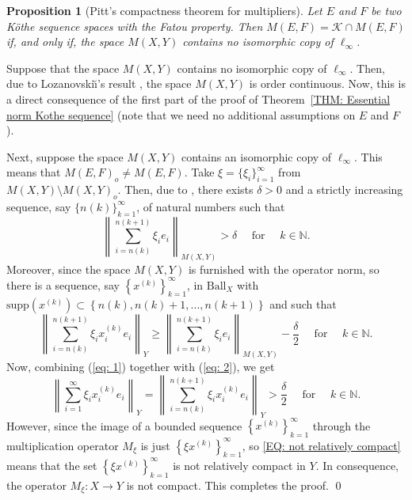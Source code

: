 \documentclass[11pt]{amsart}
\theoremstyle{definition}
\theoremstyle{definition}
\theoremstyle{definition}
\theoremstyle{definition}
\newtheorem{proposition}[theorem]{Proposition}
\theoremstyle{definition}
\theoremstyle{definition}
\theoremstyle{definition}
\theoremstyle{definition}
\numberwithin{equation}{section}
\numberwithin{equation}{section}
\numberwithin{equation}{section}
\theoremstyle{definition}
\theoremstyle{definition}
\theoremstyle{definition}
\theoremstyle{definition}
\theoremstyle{definition}
\theoremstyle{definition}
\newcommand{\norm}[1]{\left\lVert#1\right\rVert}
\renewenvironment{proof}{\noindent {\bf Proof.}}{\qed}
\begin{document}
	\begin{proposition}[Pitt's compactness theorem for multipliers] \label{PROP: Pitt's multiplication}
		{\it Let $E$ and $F$ be two K{\" o}the sequence spaces with the Fatou property. Then $M(E,F) = \mathscr{K} \cap M(E,F)$
		if, and only if, the space $M(X,Y)$ contains no isomorphic copy of $\ell_{\infty}$.}
	\end{proposition}
	\begin{proof}
		Suppose that the space $M(X,Y)$ contains no isomorphic copy of $\ell_{\infty}$. Then, due to Lozanovski{\u \i}'s result \cite{Loz69},
		the space $M(X,Y)$ is order continuous.
		Now, this is a direct consequence of the first part of the proof of Theorem~\ref{THM: Essential norm Kothe sequence}
		(note that we need no additional assumptions on $E$ and $F$).
		
		Next, suppose the space $M(X,Y)$ contains an isomorphic copy of $\ell_{\infty}$. This means that $M(E,F)_o \neq M(E,F)$.
		Take $\xi = \{ \xi_i \}_{i=1}^{\infty}$ from $M(X,Y) \setminus M(X,Y)_o$. Then, due to \cite[Lemma~5]{HN04},
		there exists $\delta > 0$ and a strictly increasing sequence, say $\{n(k)\}_{k=1}^{\infty}$, of natural numbers such that
		\begin{equation} \label{eq: 1}
			\norm{ \sum_{i = n(k)}^{n(k+1)} \xi_i e_i }_{M(X,Y)} > \delta \quad \text{ for } \quad k \in \mathbb{N}.
		\end{equation}
		Moreover, since the space $M(X,Y)$ is furnished with the operator norm, so there is a sequence, say $\left\{ x^{(k)} \right\}_{k=1}^{\infty}$,
		in $\text{Ball}_X$ with $\text{supp}( x^{(k)} ) \subset \left\{ n(k), n(k) +1, ..., n(k+1) \right\}$ and such that
		\begin{equation} \label{eq: 2}
			\norm{ \sum_{i = n(k)}^{n(k+1)} \xi_i x^{(k)}_i e_i }_Y
			\geqslant \norm{ \sum_{i = n(k)}^{n(k+1)} \xi_i e_i }_{M(X,Y)} - \frac{\delta}{2} \quad \text{ for } \quad k \in \mathbb{N}.
		\end{equation}
		Now, combining (\ref{eq: 1}) together with (\ref{eq: 2}), we get
		\begin{equation} \label{EQ: not relatively compact}
			\norm{ \sum_{i=1}^{\infty} \xi_i x^{(k)}_i e_i }_Y
				= \norm{ \sum_{i = n(k)}^{n(k+1)} \xi_i x^{(k)}_i e_i }_Y > \frac{\delta}{2}
					\quad \text{ for } \quad k \in \mathbb{N}.
		\end{equation}
		However, since the image of a bounded sequence $\left\{ x^{(k)} \right\}_{k=1}^{\infty}$ through the multiplication operator $M_{\xi}$
		is just $\left\{ \xi x^{(k)} \right\}_{k=1}^{\infty}$, so \eqref{EQ: not relatively compact} means that the set $\left\{ \xi x^{(k)} \right\}_{k=1}^{\infty}$
		is not relatively compact in $Y$.
		In consequence, the operator $M_{\xi} \colon  X \rightarrow Y$ is not compact. This completes the proof.
	\end{proof}
	
\end{document}

